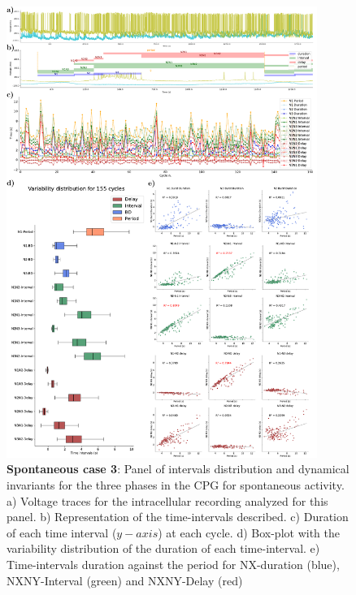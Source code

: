 \begin{figure}[htbp]
	\centering
	\includegraphics[width=0.9\textwidth]{./img/invariants/data/SUSSEX/prep1/images/3phases/panel_with_intervals.pdf}
	\caption{\textbf{Spontaneous case 3}: Panel of intervals distribution and dynamical invariants for the three phases in the CPG for spontaneous activity. a) Voltage traces for the intracellular recording analyzed for this panel. b) Representation of the time-intervals described. c) Duration of each time interval ($y-axis$) at each cycle. d) Box-plot with the variability distribution of the duration of each time-interval. e) Time-intervals duration against the period for NX-duration (blue), NXNY-Interval (green) and NXNY-Delay (red)}
	\label{fig:prep1 invariants}
\end{figure}


